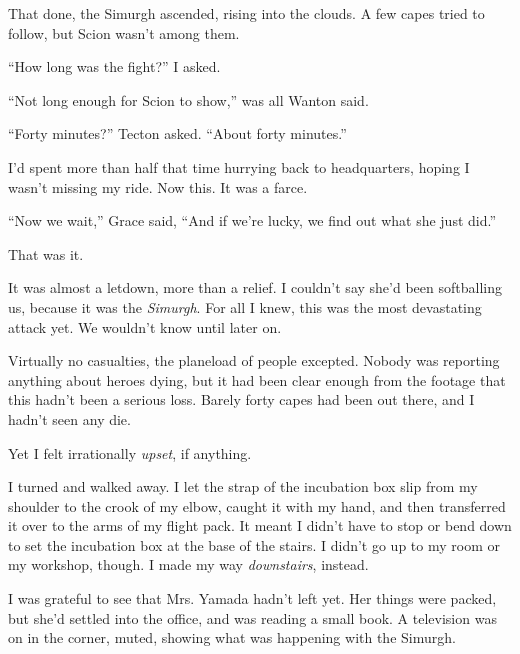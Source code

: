 That done, the Simurgh ascended, rising into the clouds.  A few capes tried to follow, but Scion wasn't among them.



``How long was the fight?'' I asked.



``Not long enough for Scion to show,'' was all Wanton said.



``Forty minutes?'' Tecton asked.  ``About forty minutes.''



I'd spent more than half that time hurrying back to headquarters, hoping I wasn't missing my ride.  Now this.  It was a farce.



``Now we wait,'' Grace said, ``And if we're lucky, we find out what she just did.''



That was it.



It was almost a letdown, more than a relief.  I couldn't say she'd been softballing us, because it was the \emph{Simurgh}.  For all I knew, this was the most devastating attack yet.  We wouldn't know until later on.



Virtually no casualties, the planeload of people excepted.  Nobody was reporting anything about heroes dying, but it had been clear enough from the footage that this hadn't been a serious loss.  Barely forty capes had been out there, and I hadn't seen any die.



Yet I felt irrationally \emph{upset}, if anything.



I turned and walked away.  I let the strap of the incubation box slip from my shoulder to the crook of my elbow, caught it with my hand, and then transferred it over to the arms of my flight pack.  It meant I didn't have to stop or bend down to set the incubation box at the base of the stairs.  I didn't go up to my room or my workshop, though.  I made my way \emph{downstairs}, instead.



I was grateful to see that Mrs. Yamada hadn't left yet.  Her things were packed, but she'd settled into the office, and was reading a small book.  A television was on in the corner, muted, showing what was happening with the Simurgh.



